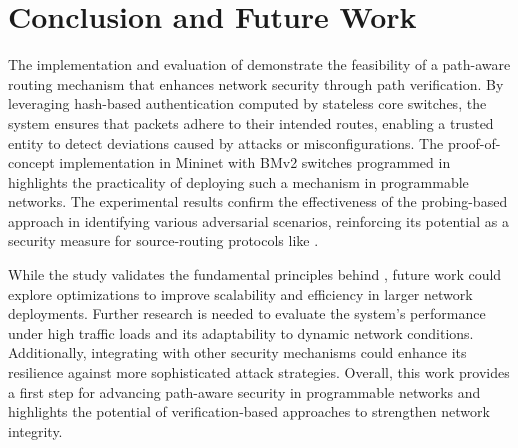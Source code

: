 \section{Conclusion and Future Work} \label{sec:conclusion}


The implementation and evaluation of \pathsec demonstrate the feasibility of a path-aware routing mechanism that enhances network security through path verification. By leveraging hash-based authentication computed by stateless core switches, the system ensures that packets adhere to their intended routes, enabling a trusted entity to detect deviations caused by attacks or misconfigurations. The proof-of-concept implementation in Mininet with BMv2 switches programmed in \pIV highlights the practicality of deploying such a mechanism in programmable networks. The experimental results confirm the effectiveness of the probing-based approach in identifying various adversarial scenarios, reinforcing its potential as a security measure for source-routing protocols like \polka.  

While the study validates the fundamental principles behind \pathsec, future work could explore optimizations to improve scalability and efficiency in larger network deployments. Further research is needed to evaluate the system’s performance under high traffic loads and its adaptability to dynamic network conditions. Additionally, integrating \pathsec with other security mechanisms could enhance its resilience against more sophisticated attack strategies. Overall, this work provides a first step for advancing path-aware security in programmable networks and highlights the potential of verification-based approaches to strengthen network integrity.






